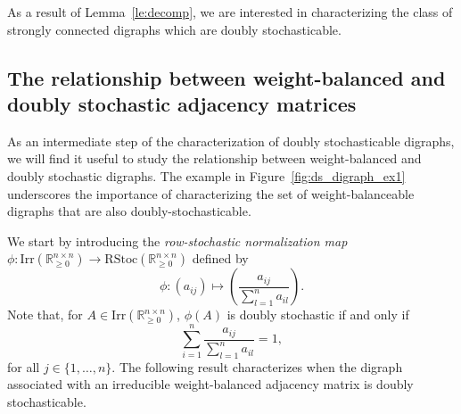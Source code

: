 \documentclass[final]{siamltex}
\begin{document}
As a result of Lemma~\ref{le:decomp}, we are interested in
characterizing the class of strongly connected digraphs which are
doubly stochasticable.

\subsection{The relationship between weight-balanced and doubly
  stochastic adjacency matrices}\label{section:wb_ds}
  
As an intermediate step of the characterization of doubly
stochasticable digraphs, we will find it useful to study the
relationship between weight-balanced and doubly stochastic digraphs.
The example in Figure~\ref{fig:ds_digraph_ex1} underscores the
importance of characterizing the set of weight-balanceable digraphs
that are also doubly-stochasticable.

We start by introducing the \emph{row-stochastic normalization map} $
\phi: \mathrm{Irr}(\mathbb{R}_{\geq 0}^{n\times n})\rightarrow
\mathrm{RStoc}(\mathbb{R}_{\geq 0}^{n\times n}) $ defined by
\[
\phi: (a_{ij}) \mapsto \left( \frac{a_{ij}}{\sum_{l=1}^na_{il}}
\right) .
\]
Note that, for $ A \in \mathrm{Irr}(\mathbb{R}_{\geq 0}^{n\times n})
$, $\phi (A)$ is doubly stochastic if and only if
\[
\sum_{i=1}^n\frac{a_{ij}}{\sum_{l=1}^na_{il}}=1,
\]
for all $ j\in \{1,\dots, n\} $.  The following result characterizes
when the digraph associated with an irreducible weight-balanced
adjacency matrix is doubly stochasticable.
\end{document}
